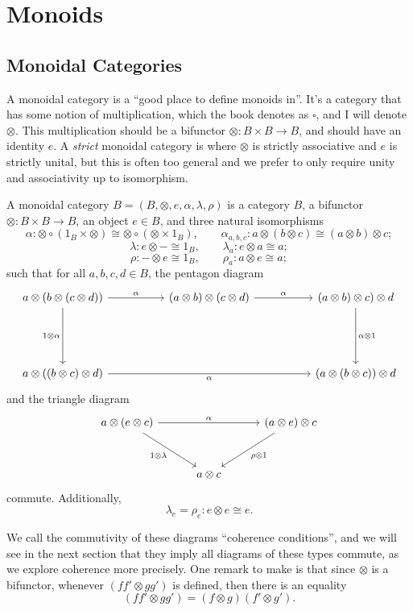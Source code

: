 \chapter{Monoids}
\section{Monoidal Categories}
A monoidal category is a ``good place to define monoids in''. It's a category that has some notion of multiplication, which the book denotes as $\square$, and I will denote $\otimes $. This multiplication should be a bifunctor $\otimes : B\times B \to B$, and should have an identity $e$. A \emph{strict} monoidal category is where $\otimes $ is strictly associative and $e$ is strictly unital, but this is often too general and we prefer to only require unity and associativity up to isomorphism.

\begin{definition}\label{dfn:7.1}
	A monoidal category $B=(B,\otimes ,e,\alpha,\lambda,\rho)$ is a category $B$, a bifunctor $\otimes : B\times B \to B$, an object $e\in B$, and three natural isomorphisms
	\[
		\alpha : \otimes \circ (1_B \times \otimes ) \cong \otimes \circ (\otimes \times 1_B),\qquad \alpha_{a,b,c} : a\otimes (b\otimes c)\cong (a\otimes b)\otimes c;
	\]
	\[
		\lambda : e\otimes - \cong 1_B,\qquad \lambda_a : e\otimes a\cong a;
	\]
	\[
		\rho : - \otimes e \cong 1_B,\qquad \rho_a : a\otimes e \cong a;
	\]
	such that for all $a,b,c,d\in B$, the pentagon diagram
	\[\begin{tikzcd}[row sep = 5em, column sep = 5em]
	a\otimes (b\otimes (c\otimes d)) \ar[" \alpha ", r] \ar[" 1 \otimes \alpha "', d]  & (a\otimes b)\otimes (c\otimes d) \ar[" \alpha ", r]  & (a\otimes b)\otimes c)\otimes d \ar[" \alpha \otimes 1 ", d]  \\
	a \otimes ((b\otimes c)\otimes d)\ar[" \alpha "', rr]  &  & (a\otimes (b\otimes c))\otimes d
	\end{tikzcd}\]
	and the triangle diagram
	\[\begin{tikzcd}[row sep = 3em, column sep = 3em]
	a\otimes (e\otimes c)\ar[" \alpha ", rr] \ar[" 1\otimes \lambda "', dr]  &  & (a\otimes e)\otimes c \ar[" \rho \otimes 1 ", dl]  \\
	 & a\otimes c & 
	\end{tikzcd}\]
	commute. Additionally,
	\[
		\lambda_e = \rho_e : e\otimes e \cong e
	.\]
\end{definition}
We call the commutivity of these diagrams ``coherence conditions'', and we will see in the next section that they imply all diagrams of these types commute, as we explore coherence more precisely. One remark to make is that since $\otimes $ is a bifunctor, whenever $(ff'\otimes gg')$ is defined, then there is an equality
\[
	(ff' \otimes gg')=(f\otimes g)(f'\otimes g')
.\]

